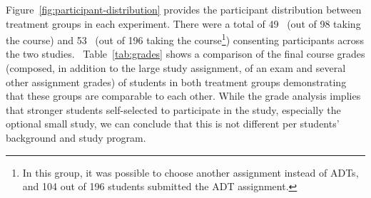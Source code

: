Figure~\ref{fig:participant-distribution} provides the participant distribution between treatment groups in each experiment. There were a total of 49 \ICS\ (out of 98 taking the course) and 53 \SEC\ (out of 196 taking the course\footnote{In this group, it was possible to choose another assignment instead of ADTs, and 104 out of 196 students submitted the ADT assignment.}) consenting participants across the two studies. \ Table~\ref{tab:grades} shows a comparison of the final course grades (composed, in addition to the large study assignment, of an exam and several other assignment grades) of students in both treatment groups demonstrating that these groups are comparable to each other. While the grade analysis implies that stronger students self-selected to participate in the study, especially the optional small study, we can conclude that this is not different per students' background and study program.



\begin{table}
\caption{Comparison of the final course grades (out of 10) for participants and non-participants. \texttt{SS} stands for small study.}
\label{tab:grades}
\end{table}


